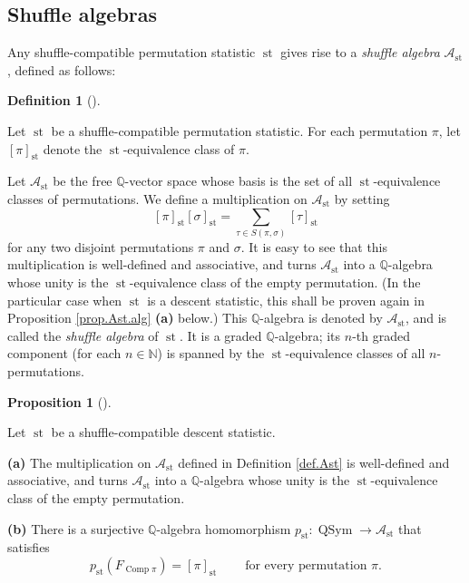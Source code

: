 \documentclass[numbers=enddot,12pt,final,onecolumn,notitlepage]{scrartcl}%
\theoremstyle{definition}
\newtheorem{prop}[theo]{Proposition}
\newenvironment{proposition}[1][]
{\begin{prop}[#1]\begin{leftbar}}
{\end{leftbar}\end{prop}}
\newtheorem{defi}[theo]{Definition}
\newenvironment{definition}[1][]
{\begin{defi}[#1]\begin{leftbar}}
{\end{leftbar}\end{defi}}
\let\sumnonlimits\sum
\renewcommand{\sum}{\sumnonlimits\limits}
\begin{document}
\subsection{Shuffle algebras}

Any shuffle-compatible permutation statistic $\operatorname*{st}$ gives rise
to a \textit{shuffle algebra} $\mathcal{A}_{\operatorname*{st}}$, defined as follows:

\begin{definition}
\label{def.Ast}Let $\operatorname*{st}$ be a shuffle-compatible permutation
statistic. For each permutation $\pi$, let $\left[  \pi\right]
_{\operatorname*{st}}$ denote the $\operatorname*{st}$-equivalence class of
$\pi$.

Let $\mathcal{A}_{\operatorname*{st}}$ be the free $\mathbb{Q}$-vector space
whose basis is the set of all $\operatorname*{st}$-equivalence classes of
permutations. We define a multiplication on $\mathcal{A}_{\operatorname*{st}}$
by setting%
\[
\left[  \pi\right]  _{\operatorname*{st}}\left[  \sigma\right]
_{\operatorname*{st}}=\sum_{\tau\in S\left(  \pi,\sigma\right)  }\left[
\tau\right]  _{\operatorname*{st}}%
\]
for any two disjoint permutations $\pi$ and $\sigma$. It is easy to see that
this multiplication is well-defined and associative, and turns $\mathcal{A}%
_{\operatorname*{st}}$ into a $\mathbb{Q}$-algebra whose unity is the
$\operatorname*{st}$-equivalence class of the empty permutation. (In the
particular case when $\operatorname*{st}$ is a descent statistic, this shall
be proven again in Proposition \ref{prop.Ast.alg} \textbf{(a)} below.) This
$\mathbb{Q}$-algebra is denoted by $\mathcal{A}_{\operatorname*{st}}$, and is
called the \textit{shuffle algebra} of $\operatorname*{st}$. It is a graded
$\mathbb{Q}$-algebra; its $n$-th graded component (for each $n\in\mathbb{N}$)
is spanned by the $\operatorname*{st}$-equivalence classes of all $n$-permutations.
\end{definition}

\begin{proposition}
\label{prop.Ast.alg}Let $\operatorname*{st}$ be a shuffle-compatible descent statistic.

\textbf{(a)} The multiplication on $\mathcal{A}_{\operatorname*{st}}$ defined
in Definition \ref{def.Ast} is well-defined and associative, and turns
$\mathcal{A}_{\operatorname*{st}}$ into a $\mathbb{Q}$-algebra whose unity is
the $\operatorname*{st}$-equivalence class of the empty permutation.

\textbf{(b)} There is a surjective $\mathbb{Q}$-algebra homomorphism
$p_{\operatorname*{st}}:\operatorname*{QSym}\rightarrow\mathcal{A}%
_{\operatorname*{st}}$ that satisfies
\[
p_{\operatorname*{st}}\left(  F_{\operatorname*{Comp}\pi}\right)  =\left[
\pi\right]  _{\operatorname*{st}}\ \ \ \ \ \ \ \ \ \ \text{for every
permutation }\pi.
\]

\end{proposition}
\end{document}
